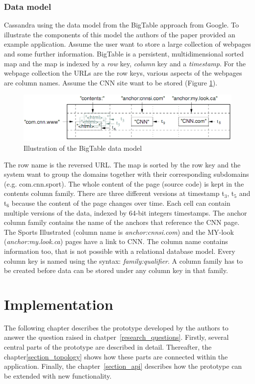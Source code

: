 \documentclass[a4paper]{article}
\begin{document}
\subsubsection{Data model}
Cassandra using the data model from the BigTable \cite{chang2008bigtable} approach from Google. To illustrate the components of this model the authors of the paper provided an example application. Assume the user want to store a large collection of webpages and some further information. BigTable is a persistent, multidimensional sorted map and the map is indexed by a \textit{row} key, \textit{column} key and a \textit{timestamp}. For the webpage collection the URLs are the row keys, various aspects of the webpages are column names. Assume the CNN site want to be stored (Figure \ref{model_bigtable}).
\begin{figure}[h!]
	\centering
	\includegraphics[scale=0.4]{images/modelBigTable.png}
	\caption{Illustration of the BigTable data model}
	\label{model_bigtable}
\end{figure}
The row name is the reversed URL. The map is sorted by the row key and the system want to group the domains together with their corresponding subdomains (e.g. com.cnn.sport). The whole content of the page (source code) is kept in the contents column family. There are three different versions at timestamp t$_{3}$, t$_{5}$ and t$_{6}$ because the content of the page changes over time. Each cell can contain multiple versions of the data, indexed by 64-bit integers timestamps. The anchor column family contains the name of the anchors that reference the CNN page. The Sports Illustrated (column name is \textit{anchor:cnnsi.com}) and the MY-look (\textit{anchor:my.look.ca}) pages have a link to CNN. The column name contains information too, that is not possible with a relational database model. Every column key is named using the syntax: \textit{family:qualifier}. A column family has to be created before data can be stored under any column key in that family.


\section{Implementation}
The following chapter describes the prototype developed by the authors to answer the question raised in chatper~\ref{research_questions}. Firstly, several central parts of the prototype are described in detail. Thereafter, the chapter\ref{section_topology} shows how these parts are connected within the application. Finally, the chapter~\ref{section_api} describes how the prototype can be extended with new functionality.
\end{document}
